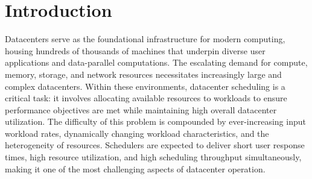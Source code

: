\chapter{Introduction}
\label{firstcontentpage} %

%
%

%
Datacenters serve as the foundational infrastructure for modern computing,
housing hundreds of thousands of machines that underpin diverse user
applications and data-parallel computations. The escalating demand for compute,
memory, storage, and network resources necessitates increasingly large and
complex datacenters. Within these environments, datacenter scheduling is a
critical task: it involves allocating available resources to workloads to
ensure performance objectives are met while maintaining high overall datacenter
utilization. The difficulty of this problem is compounded by ever-increasing
input workload rates, dynamically changing workload characteristics, and the
heterogeneity of resources. Schedulers are expected to deliver short user
response times, high resource utilization, and high scheduling throughput
simultaneously, making it one of the most challenging aspects of datacenter
operation.

